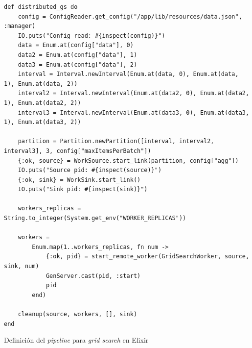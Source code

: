 \documentclass[11pt]{article}
\begin{document}
\begin{listing}[ht]
\begin{verbatim}
def distributed_gs do
    config = ConfigReader.get_config("/app/lib/resources/data.json", :manager)
    IO.puts("Config read: #{inspect(config)}")
    data = Enum.at(config["data"], 0)
    data2 = Enum.at(config["data"], 1)
    data3 = Enum.at(config["data"], 2)
    interval = Interval.newInterval(Enum.at(data, 0), Enum.at(data, 1), Enum.at(data, 2))
    interval2 = Interval.newInterval(Enum.at(data2, 0), Enum.at(data2, 1), Enum.at(data2, 2))
    interval3 = Interval.newInterval(Enum.at(data3, 0), Enum.at(data3, 1), Enum.at(data3, 2))
    
    partition = Partition.newPartition([interval, interval2, interval3], 3, config["maxItemsPerBatch"])
    {:ok, source} = WorkSource.start_link(partition, config["agg"])
    IO.puts("Source pid: #{inspect(source)}")
    {:ok, sink} = WorkSink.start_link()
    IO.puts("Sink pid: #{inspect(sink)}")
    
    workers_replicas = String.to_integer(System.get_env("WORKER_REPLICAS"))
    
    workers =
        Enum.map(1..workers_replicas, fn num ->
            {:ok, pid} = start_remote_worker(GridSearchWorker, source, sink, num)
            GenServer.cast(pid, :start)
            pid
        end)
    
    cleanup(source, workers, [], sink)
end
\end{verbatim}
\caption{Definición del \textit{pipeline} para \textit{grid search} en Elixir}
\label{code:elx:gs}
\end{listing}
\end{document}
